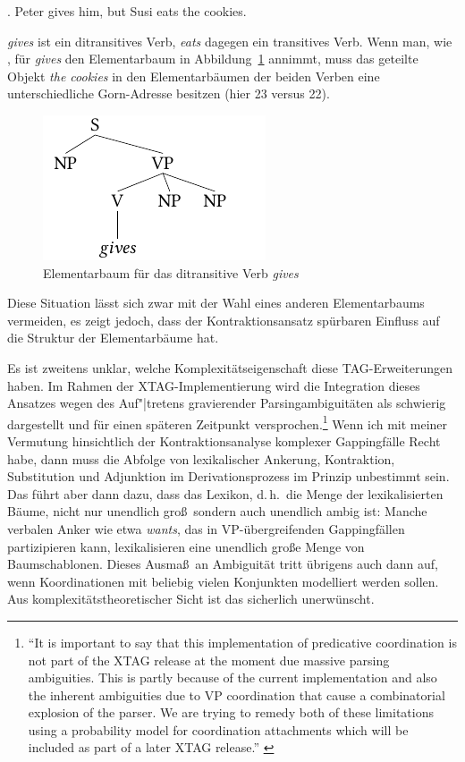 \ex. \label{ex-contraction-4} Peter gives him, but Susi eats the cookies.

{\it gives} ist ein ditransitives Verb, {\it eats} dagegen ein transitives Verb. Wenn man, wie \citet[Figure~20]{Sarkar:Joshi:97}, für {\it gives} den Elementarbaum in Abbildung~\ref{fig-contraction-5} annimmt, muss das geteilte Objekt {\it the cookies} in den Elementarbäumen der beiden Verben eine unterschiedliche Gorn-Adresse besitzen (hier 23 versus 22).
\begin{figure}[t]
\centering
\includegraphics{graphics/abb810.pdf}
\caption{\label{fig-contraction-5}Elementarbaum für das ditransitive Verb {\it gives}}
\end{figure}
Diese Situation lässt sich zwar mit der Wahl eines anderen Elementarbaums vermeiden, es zeigt jedoch, dass der Kontraktionsansatz spürbaren Einfluss auf die Struktur der Elementarbäume hat. %

Es ist zweitens unklar, welche Komplexitätseigenschaft diese TAG-Erweiter\-ungen haben. Im Rahmen der XTAG-Implementierung \citep{xtag:01} wird die Integration dieses Ansatzes wegen des Auf"|tretens gravierender Parsingambiguitäten als schwierig dargestellt und für einen späteren Zeitpunkt versprochen.\footnote{"`It is important to say that this implementation of predicative coordination is not part of the XTAG release at the moment due massive parsing ambiguities. This is partly because of the current implementation and also the inherent ambiguities due to VP coordination that cause a combinatorial explosion of the parser. We are trying to remedy both of these limitations using a probability model for coordination attachments which will be included as part of a later XTAG release."' \citep[224]{xtag:01}} Wenn ich mit meiner Vermutung hinsichtlich der Kontraktionsanalyse komplexer Gappingfälle Recht habe, dann muss die Abfolge von lexikalischer Ankerung, Kontraktion, Substitution und Adjunktion im Derivationsprozess im Prinzip unbestimmt sein. Das führt aber dann dazu, dass das Lexikon, d.\,h.\ die Menge der lexikalisierten Bäume, nicht nur unendlich gro\ss\, sondern auch unendlich ambig ist: Manche verbalen Anker wie etwa {\it wants}, das in VP-übergreifenden Gappingfällen partizipieren kann, lexikalisieren eine unendlich gro\ss e Menge von Baumschablonen. Dieses Ausma\ss\ an Ambiguität tritt übrigens auch dann auf, wenn Koordinationen mit beliebig vielen Konjunkten modelliert werden sollen. Aus komplexitätstheoretischer Sicht ist das sicherlich unerwünscht.    



